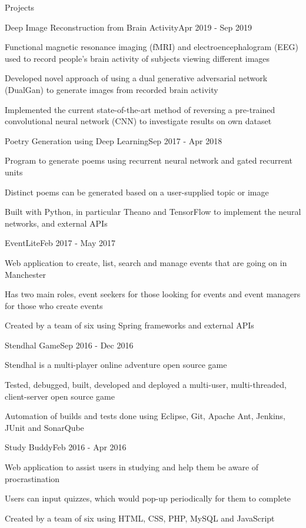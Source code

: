 \documentclass{techresume} %
\begin{document}
\begin{rSection}{Projects}

\begin{rSubsection}{Deep Image Reconstruction from Brain Activity}{Apr 2019 - Sep 2019}{}{}
\item Functional magnetic resonance imaging (fMRI) and electroencephalogram (EEG) used to record people’s brain activity of subjects viewing different images
\item Developed novel approach of using a dual generative adversarial network (DualGan) to generate images from
recorded brain activity
\item Implemented the current state-of-the-art method of reversing a pre-trained convolutional neural network (CNN)
to investigate results on own dataset
\end{rSubsection}

\begin{rSubsection}{Poetry Generation using Deep Learning}{Sep 2017 - Apr 2018}{}{}
\item Program to generate poems using recurrent neural network and gated recurrent units
\item Distinct poems can be generated based on a user-supplied topic or image
\item Built with Python, in particular Theano and TensorFlow to implement the neural networks, and external APIs
\end{rSubsection}

\begin{rSubsection}{EventLite}{Feb 2017 - May 2017}{}{}
\item Web application to create, list, search and manage events that are going on in Manchester
\item Has two main roles, event seekers for those looking for events and event managers for those who create events
\item Created by a team of six using Spring frameworks and external APIs
\end{rSubsection}

\begin{rSubsection}{Stendhal Game}{Sep 2016 - Dec 2016}{}{}
\item Stendhal is a multi-player online adventure open source game
\item Tested, debugged, built, developed and deployed a multi-user, multi-threaded, client-server open source game
\item Automation of builds and tests done using Eclipse, Git, Apache Ant, Jenkins, JUnit and SonarQube
\end{rSubsection}

\begin{rSubsection}{Study Buddy}{Feb 2016 - Apr 2016}{}{}
\item Web application to assist users in studying and help them be aware of procrastination
\item Users can input quizzes, which would pop-up periodically for them to complete
\item Created by a team of six using HTML, CSS, PHP, MySQL and JavaScript
\end{rSubsection}

\end{rSection}
\end{document}
